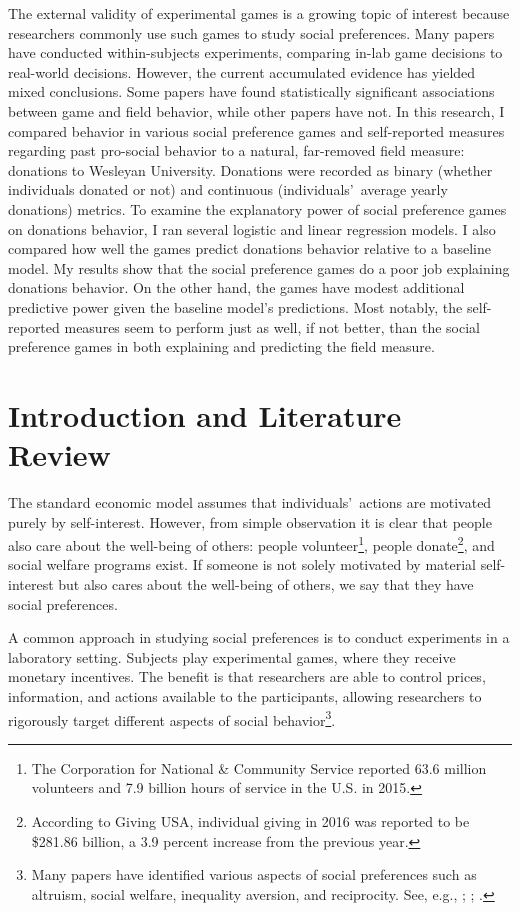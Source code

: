 \documentclass[12pt]{article}
\begin{document}
The external validity of experimental games is a growing topic of interest because researchers commonly use such games to study social preferences. Many papers have conducted within-subjects experiments, comparing in-lab game decisions to real-world decisions. However, the current accumulated evidence has yielded mixed conclusions. Some papers have found statistically significant associations between game and field behavior, while other papers have not. In this research, I compared behavior in various social preference games and self-reported measures regarding past pro-social behavior to a natural, far-removed field measure: donations to Wesleyan University. Donations were recorded as binary (whether individuals donated or not) and continuous (individuals\rq \ average yearly donations) metrics. To examine the explanatory power of social preference games on donations behavior, I ran several logistic and linear regression models. I also compared how well the games predict donations behavior relative to a baseline model. My results show that the social preference games do a poor job explaining donations behavior. On the other hand, the games have modest additional predictive power given the baseline model\rq s predictions. Most notably, the self-reported measures seem to perform just as well, if not better, than the social preference games in both explaining and predicting the field measure. 



\newpage


\doublespacing
\section{Introduction and Literature Review}

The standard economic model assumes that individuals\rq \ actions are motivated purely by self-interest. However, from simple observation it is clear that people also care about the well-being of others: people volunteer\footnote{The Corporation for National \& Community Service reported 63.6 million volunteers and 7.9 billion hours of service in the U.S. in 2015.}, people donate\footnote{According to Giving USA, individual giving in 2016 was reported to be \$281.86 billion, a 3.9 percent increase from the previous year.}, and social welfare programs exist. If someone is not solely motivated by material self-interest but also cares about the well-being of others, we say that they have social preferences. 

A common approach in studying social preferences is to conduct experiments in a laboratory setting. Subjects play experimental games, where they receive monetary incentives. The benefit is that researchers are able to control prices, information, and actions available to the participants, allowing researchers to rigorously target different aspects of social behavior\footnote{Many papers have identified various aspects of social preferences such as altruism, social welfare, inequality aversion, and reciprocity. See, e.g., \cite{charness_rabin_2002}; \cite{rabin_1993}; \cite{fisman_jakiela_kariv_2014}.}.
\end{document}
